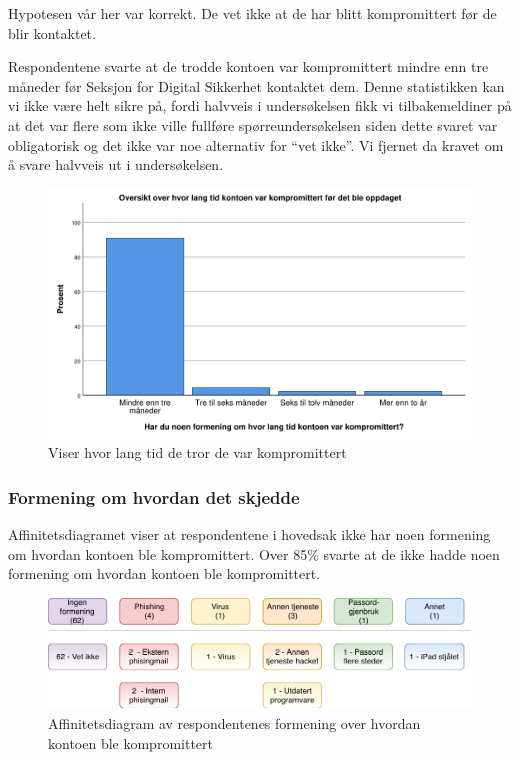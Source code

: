 Hypotesen vår her var korrekt. De vet ikke at de har blitt kompromittert før de blir kontaktet.

Respondentene svarte at de trodde kontoen var kompromittert mindre enn tre måneder før Seksjon for Digital Sikkerhet kontaktet dem. Denne statistikken kan vi ikke være helt sikre på, fordi halvveis i undersøkelsen fikk vi tilbakemeldiner på at det var flere som ikke ville fullføre spørreundersøkelsen siden dette svaret var obligatorisk og det ikke var noe alternativ for ``vet ikke''. Vi fjernet da kravet om å svare halvveis ut i undersøkelsen. 
\begin{figure}[H]
    \centering
    \includegraphics[scale=0.5]{case_2/bilder/spss/lang_tid_konto_kompromittert.pdf}
    \caption[Hvor lang tid de tror de var kompromittert]{Viser hvor lang tid de tror de var kompromittert}
    \label{fig:fant-ut-kompromittert}
\end{figure}

\subsubsection{Formening om hvordan det skjedde}
Affinitetsdiagramet viser at respondentene i hovedsak ikke har noen formening om hvordan kontoen ble kompromittert. Over 85\% svarte at de ikke hadde noen formening om hvordan kontoen ble kompromittert.
\begin{figure}[H]
    \centering
    \includegraphics[scale=0.8]{case_2/bilder/Affinitetsdiagram.pdf}
    \caption[Affinitetsdiagram av formening om hvordan det skjedde]{Affinitetsdiagram av respondentenes formening over hvordan kontoen ble kompromittert}
    \label{fig:case2-affinitetsdiagram}
\end{figure}

